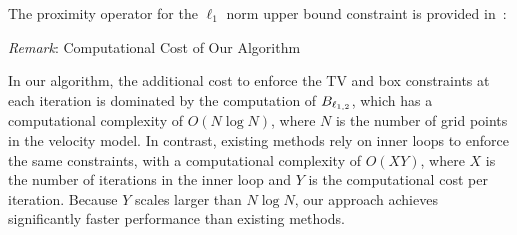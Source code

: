 The proximity operator for the $\ell_1$ norm upper bound constraint is provided in~\cite{L1-ball-projection}:

\vspace{4mm}
\noindent \textit{Remark}: Computational Cost of Our Algorithm
\vspace{2mm}


In our algorithm, the additional cost to enforce the TV and box constraints at each iteration is dominated by the computation of $B_{\ell_{1,2}}$, which has a computational complexity of $O(N \log N)$, where $N$ is the number of grid points in the velocity model.
In contrast, existing methods rely on inner loops to enforce the same constraints, with a computational complexity of $O(XY)$, where $X$ is the number of iterations in the inner loop and $Y$ is the computational cost per iteration.
Because $Y$ scales larger than $N \log N$, our approach achieves significantly faster performance than existing methods.
